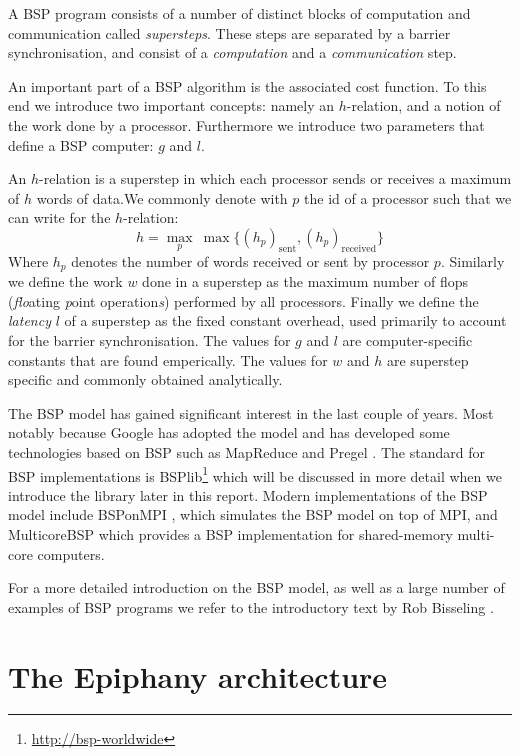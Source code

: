 \documentclass[fleqn]{article}
\renewcommand{\(}{\left(}
\renewcommand{\)}{\right)}
\def\tm{$^{\hbox{\tiny TM}}$~}
\renewcommand{\tm}{ }
\begin{document}
A BSP program consists of a number of distinct blocks of computation and communication called \emph{supersteps}. These steps are separated by a barrier synchronisation, and consist of a \emph{computation} and a \emph{communication} step.

An important part of a BSP algorithm is the associated cost function. To this end we introduce two important concepts: namely an $h$-relation, and a notion of the work done by a processor. Furthermore we introduce two parameters that define a BSP computer: $g$ and $l$.

An $h$-relation is a superstep in which each processor sends or receives a maximum of $h$ words of data.We commonly denote with $p$ the id of a processor such that we can write for the $h$-relation:
$$h = \max_{p} ~ \max \{ (h_p)_\text{sent} ,  (h_p)_\text{received} \}$$
Where $h_p$ denotes the number of words received or sent by processor $p$. Similarly we define the work $w$ done in a superstep as the maximum number of flops (\emph{flo}ating \emph{p}oint operation\emph{s})  performed by all processors. Finally we define the \emph{latency} $l$ of a superstep as the fixed constant overhead, used primarily to account for the barrier synchronisation. The values for $g$ and $l$ are computer-specific constants that are found emperically. The values for $w$ and $h$ are superstep specific and commonly obtained analytically.

The BSP model has gained significant interest in the last couple of years. Most notably because Google has adopted the model and has developed some technologies based on BSP such as MapReduce \cite{goo:mapreduce} and Pregel \cite{goo:pregel}. The standard for BSP implementations is BSPlib\footnote{\url{http://bsp-worldwide}} which will be discussed in more detail when we introduce the library later in this report. Modern implementations of the BSP model include BSPonMPI \cite{bsponmpi}, which simulates the BSP model on top of MPI, and MulticoreBSP \cite{multicorebsp} which provides a BSP implementation for shared-memory multi-core computers.

For a more detailed introduction on the BSP model, as well as a large number of examples of BSP programs we refer to the introductory text by Rob Bisseling \cite{bsp:bisseling}.

\section{The Epiphany\tm architecture}
\end{document}
